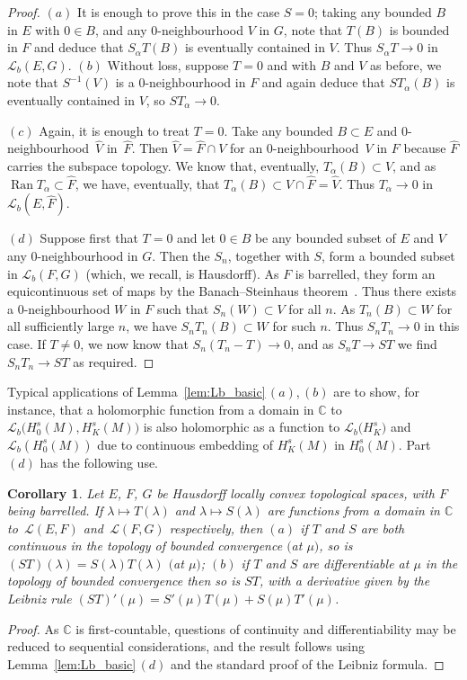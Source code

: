 \documentclass[pdftex]{sigma}
\numberwithin{equation}{section}
\newtheorem{Corollary}[Theorem]{Corollary}
\newcommand{\CC}{{\mathbb C}}
\newcommand{\LL}{{\mathcal L}}
\newcommand{\Ran}{\operatorname{Ran}}
\begin{document}
 \begin{proof}
 	$(a)$ It is enough to prove this in the case $S=0$; taking any bounded $B$ in $E$ with $0\in B$, and any $0$-neighbourhood $V$ in $G$, note that $T(B)$ is bounded in $F$ and deduce that $S_\alpha T(B)$ is eventually contained in $V$. Thus $S_\alpha T\to 0$ in $\LL_b(E,G)$. $(b)$ Without loss, suppose $T=0$ and with $B$ and $V$ as before, we note that $S^{-1}(V)$ is a $0$-neighbourhood in $F$ and again deduce that $ST_\alpha(B)$ is eventually contained in $V$, so $ST_\alpha\to 0$.
 	
 	$(c)$ Again, it is enough to treat $T=0$. Take any bounded $B\subset E$ and $0$-neighbourhood~$\hat{V}$ in~$\hat{F}$. Then $\hat{V}=\hat{F}\cap V$ for an $0$-neighbourhood~$V$ in $F$ because $\hat{F}$ carries the subspace topology. We know that, eventually, $T_\alpha(B)\subset V$, and as $\Ran T_\alpha\subset \hat{F}$, we have, eventually, that $T_\alpha(B)\subset V\cap\hat{F}= \hat{V}$. Thus $T_\alpha\to 0$ in $\LL_b(E,\hat{F})$.
 	
 	$(d)$ Suppose first that $T=0$ and let $0\in B$
 	be any bounded subset of $E$ and $V$ any $0$-neighbourhood in $G$. Then
 	the $S_n$, together with $S$, form a bounded subset in $\LL_b(F,G)$ (which, we recall, is Hausdorff). As $F$ is barrelled, they form an equicontinuous set of maps by the Banach--Steinhaus theorem~\cite[Theorem 33.1]{Treves:TVS}. Thus there exists
 	a $0$-neighbourhood $W$ in $F$ such that $S_n (W)\subset V$ for all $n$.
 	As $T_n(B)\subset W$ for all sufficiently large $n$, we have $S_nT_n(B)\subset W$ for such $n$. Thus $S_nT_n\to 0$ in this case. If $T\neq 0$, we now know
 	that $S_n(T_n-T)\to 0$, and as $S_n T\to ST$ we find $S_nT_n\to ST$ as required.
 \end{proof}

 Typical applications of Lemma~\ref{lem:Lb_basic}\,$(a)$,\,$(b)$ are to show, for instance, that a holomorphic function from a domain in $\CC$ to $\LL_b\big(H^s_0(M),H^s_K(M)\big)$ is also holomorphic as a function to $\LL_b\big(H^s_K\big)$ and
 $\LL_b(H^s_0(M))$ due to continuous embedding of $H_K^s(M)$ in $H^s_0(M)$. Part~$(d)$ has the following use.
 \begin{Corollary}\label{cor:Leibniz}
 	Let $E$, $F$, $G$ be Hausdorff locally convex topological spaces, with $F$ being barrelled.
 	If $\lambda\mapsto T(\lambda)$ and $\lambda\mapsto S(\lambda)$ are functions from a domain in $\CC$ to~$\LL(E,F)$ and~$\LL(F,G)$ respectively, then $(a)$ if $T$ and $S$ are both continuous in the topology of bounded convergence $($at $\mu$$)$, so is $(ST)(\lambda)=S(\lambda)T(\lambda)$ $($at $\mu$$)$; $(b)$ if $T$ and $S$ are differentiable at $\mu$ in the topology of bounded convergence then so is $ST$, with a derivative given by the Leibniz rule
 	$(ST)'(\mu)=S'(\mu)T(\mu) + S(\mu)T'(\mu)$.
 \end{Corollary}
 \begin{proof}
 	As $\CC$ is first-countable, questions of continuity and differentiability may be reduced to sequential considerations, and the result follows using Lemma~\ref{lem:Lb_basic}\,$(d)$ and the standard proof of the Leibniz formula.
 \end{proof}
\end{document}

